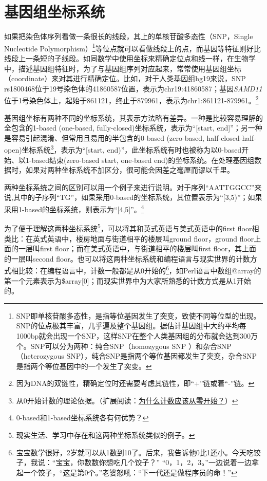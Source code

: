 \documentclass[11pt,a4paper,twoside]{book}
\begin{document}
\section{基因组坐标系统}
如果把染色体序列看做一条很长的线段，其上的单核苷酸多态性（SNP，Single Nucleotide Polymorphism）\footnote{SNP即单核苷酸多态性，是指等位基因发生了突变，致使不同等位型的出现。SNP的位点极其丰富，几乎遍及整个基因组。据估计基因组中大约平均每1000bp就会出现一个SNP，这样SNP在整个人类基因组的分布就会达到300万个。SNP可以分为两种：纯合SNP（homozygous SNP ）和杂合SNP（heterozygous SNP），纯合SNP是指两个等位基因都发生了突变，杂合SNP是指两个等位基因中的一个发生了突变。}等位点就可以看做线段上的点，而基因等特征则好比线段上一条短的子线段。如同数学中使用坐标来精确定位点和线一样，在生物学中，描述基因组特征时，为了与基因组序列对应起来，常常使用基因组坐标（coordinate）来对其进行精确定位。比如，对于人类基因组hg19来说，SNP rs1800468位于19号染色体的41860587位置，表示为chr19:41860587；基因\textit{SAMD11}位于1号染色体上，起始于861121，终止于879961，表示为chr1:861121-879961。\footnote{因为DNA的双链性，精确定位时还需要考虑其链性，即“+”链或着“-”链。}

基因组坐标有两种不同的坐标系统，其表示方法略有差异。一种是比较容易理解的全包含的1-based (one-based, fully-closed)坐标系统，表示为“[start, end]”；另一种是容易引起混淆、但常用且易用的半包含的0-based (zero-based, half-closed-half-open)坐标系统\footnote{从0开始计数的理论依据。（扩展阅读：\href{http://wangcong.org/blog/archives/2230}{为什么计数应该从零开始？}）}，表示为“[start, end)”，此坐标系统有时也被称为以0-based开始、以1-based结束(zero-based start, one-based end)的坐标系统。在处理基因组数据时，如果对两种坐标系统不加区分，很可能会因差之毫厘而谬以千里。

两种坐标系统之间的区别可以用一个例子来进行说明。对于序列“AATTGGCC”来说,其中的子序列“TG”，如果采用0-based的坐标系统，其位置表示为“[3,5)”；如果采用1-based的坐标系统，则表示为“[4,5]”。\footnote{0-based和1-based坐标系统各有何优势？}

为了便于理解这两种坐标系统\footnote{现实生活、学习中存在和这两种坐标系统类似的例子。}，可以将其和英式英语与美式英语中的first floor相类比：在英式英语中，楼房地面与街道相平的楼层叫ground floor，ground floor上面的一层叫first floor；而在美式英语中，与街道相平的楼层叫first floor，其上面的一层叫second floor。也可以将这两种坐标系统和编程语言与现实世界的计数方式相比较：在编程语言中，计数一般都是从0开始的\footnote{宝宝数学很好，2岁就可以从1数到10了。后来，我告诉他0比1还小。今天吃饺子，我说：“宝宝，你数数你想吃几个饺子？” “0，1，2，3。”一边说着一边拿起一个饺子，“这是第0个。”老婆怒吼：“下一代还是做程序员的命！”}，如Perl语言中数组@array的第一个元素表示为\$array[0]；而现实世界中为大家所熟悉的计数方式是从1开始的。
\end{document}
